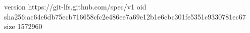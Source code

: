 version https://git-lfs.github.com/spec/v1
oid sha256:ac64e6db75ecb716658cfc2e486ee7a69e12b1e6cbc301fe5351c9330781ec67
size 1572960
